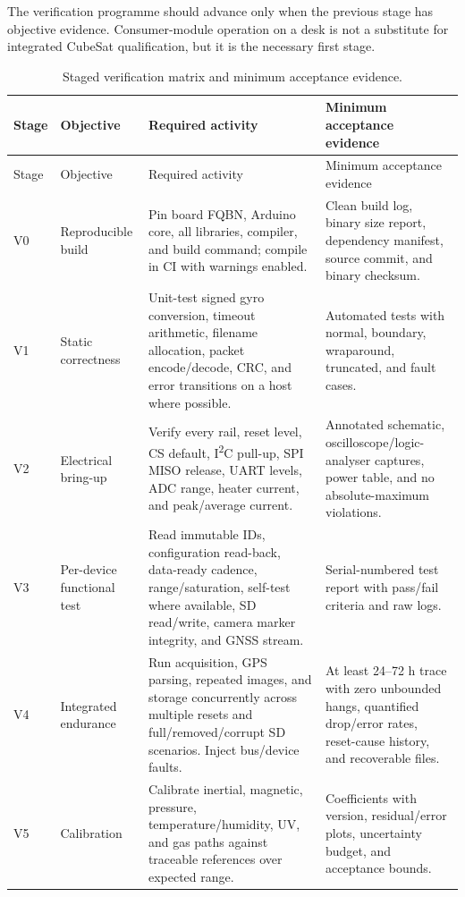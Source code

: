 \documentclass[11pt,a4paper]{article}
\begin{document}
The verification programme should advance only when the previous stage has objective evidence. Consumer-module operation on a desk is not a substitute for integrated CubeSat qualification, but it is the necessary first stage.

\begin{longtable}{P{0.10\textwidth}P{0.18\textwidth}P{0.30\textwidth}P{0.31\textwidth}}
\caption{Staged verification matrix and minimum acceptance evidence.}\label{tab:verification}\\
\toprule
Stage & Objective & Required activity & Minimum acceptance evidence\\
\midrule
\endfirsthead
\toprule
Stage & Objective & Required activity & Minimum acceptance evidence\\
\midrule
\endhead
V0 & Reproducible build & Pin board FQBN, Arduino core, all libraries, compiler, and build command; compile in CI with warnings enabled. & Clean build log, binary size report, dependency manifest, source commit, and binary checksum.\\
V1 & Static correctness & Unit-test signed gyro conversion, timeout arithmetic, filename allocation, packet encode/decode, CRC, and error transitions on a host where possible. & Automated tests with normal, boundary, wraparound, truncated, and fault cases.\\
V2 & Electrical bring-up & Verify every rail, reset level, CS default, I\textsuperscript{2}C pull-up, SPI MISO release, UART levels, ADC range, heater current, and peak/average current. & Annotated schematic, oscilloscope/logic-analyser captures, power table, and no absolute-maximum violations.\\
V3 & Per-device functional test & Read immutable IDs, configuration read-back, data-ready cadence, range/saturation, self-test where available, SD read/write, camera marker integrity, and GNSS stream. & Serial-numbered test report with pass/fail criteria and raw logs.\\
V4 & Integrated endurance & Run acquisition, GPS parsing, repeated images, and storage concurrently across multiple resets and full/removed/corrupt SD scenarios. Inject bus/device faults. & At least 24--72 h trace with zero unbounded hangs, quantified drop/error rates, reset-cause history, and recoverable files.\\
V5 & Calibration & Calibrate inertial, magnetic, pressure, temperature/humidity, UV, and gas paths against traceable references over expected range. & Coefficients with version, residual/error plots, uncertainty budget, and acceptance bounds.\\

\end{longtable}
\end{document}

